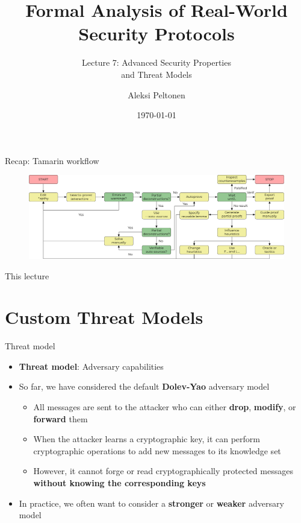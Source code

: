 \documentclass[11pt,aspectratio=169]{beamer}
\title{Formal Analysis of Real-World Security Protocols}
\subtitle{Lecture 7: Advanced Security Properties\\ and Threat Models}
\date{\today}
\author{Aleksi Peltonen}
\institute{CISPA Helmholtz Center for Information Security}
\begin{document}
\maketitle


\begin{frame}[fragile]{Recap: Tamarin workflow}
    \begin{figure}
        \includegraphics[width=\textwidth]{./figures/lecture_9/workflow_gui}
    \end{figure}
\end{frame}

\begin{frame}[fragile]{This lecture}
    \tableofcontents
\end{frame}


\section{Custom Threat Models}


\begin{frame}[fragile]{Threat model}
    \begin{itemize}
        \item \textbf{Threat model}: Adversary capabilities
        \item So far, we have considered the default \textbf{Dolev-Yao} 
              adversary model
        \begin{itemize}
            \item All messages are sent to the attacker who can either
                  \textbf{drop}, \textbf{modify}, or \textbf{forward} them
            \item When the attacker learns a cryptographic key, it can perform 
                  cryptographic operations to add new messages to its knowledge 
                  set
            \item However, it cannot forge or read cryptographically protected 
                  messages \textbf{without knowing the corresponding keys}
        \end{itemize}
        \item In practice, we often want to consider a \textbf{stronger} or 
              \textbf{weaker} adversary model
    \end{itemize}
\end{frame}
\end{document}
